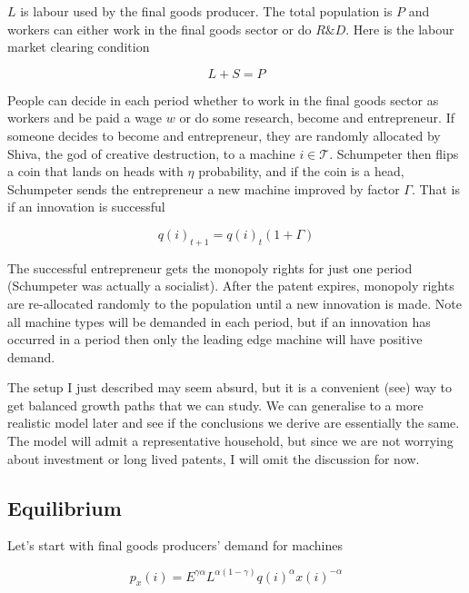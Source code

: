 \documentclass[12pt,english]{article}
\theoremstyle{definition}
\theoremstyle{plain}
\theoremstyle{plain}
\theoremstyle{remark}
\theoremstyle{definition}
\theoremstyle{plain}
\theoremstyle{plain}
\theoremstyle{remark}
\theoremstyle{plain}
\theoremstyle{remark}
\theoremstyle{plain}
\theoremstyle{plain}
\theoremstyle{plain}
\begin{document}
$L$ is labour used by the final goods producer. The total population is $P$ and workers can either work in the final goods sector or do $R\&D$. Here is the labour market clearing condition 

\begin{equation*}
L + S = P
\end{equation*}

People can decide in each period whether to work in the final goods sector as workers and be paid a wage $w$ or do some research, become and entrepreneur. If someone decides to become and entrepreneur, they are randomly allocated by Shiva, the god of creative destruction, to a machine $i\in \mathscr{T}$. Schumpeter then flips a coin that lands on heads with $\eta$ probability, and if the coin is a head, Schumpeter sends the entrepreneur a new machine improved by factor $\Gamma$. That is if an innovation is successful

\begin{equation*}
q\left(i\right)_{t+1} = q\left(i\right)_{t}\left(1+\Gamma\right)
\end{equation*}

The successful entrepreneur gets the monopoly rights for just one period (Schumpeter was actually a socialist). After the patent expires, monopoly rights are re-allocated randomly to the population until a new innovation is made. Note all machine types will be demanded in each period, but if an innovation has occurred in a period then only the leading edge machine will have positive demand. 

The setup I just described may seem absurd, but it is a convenient (see\cite{Acemoglu2012}) way to get balanced growth paths that we can study. We can generalise to a more realistic model later and see if the conclusions we derive are essentially the same. The model will admit a representative household, but since we are not worrying about investment or long lived patents, I will omit the discussion for now. 

\subsection{Equilibrium}

Let's start with final goods producers' demand for machines

\begin{equation*}
p_{x}\left(i\right) = E^{\gamma\alpha}L^{\alpha\left(1-\gamma\right)}q\left(i\right)^{\alpha}x\left(i\right)^{-\alpha}
\end{equation*}
\end{document}
